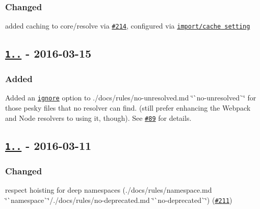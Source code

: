 \subsubsection*{Changed}


\begin{DoxyItemize}
\item added caching to core/resolve via \href{https://github.com/benmosher/eslint-plugin-import/issues/214}{\tt \#214}, configured via \href{./README.md#importcache}{\tt {\ttfamily import/cache} setting}
\end{DoxyItemize}

\subsection*{\href{https://github.com/benmosher/eslint-plugin-import/compare/v1.0.4...v1.1.0}{\tt 1..} -\/ 2016-\/03-\/15}

\subsubsection*{Added}


\begin{DoxyItemize}
\item Added an \href{./docs/rules/no-unresolved.md#ignore}{\tt {\ttfamily ignore}} option to ./docs/rules/no-\/unresolved.md \char`\"{}\`{}no-\/unresolved\`{}\char`\"{} for those pesky files that no resolver can find. (still prefer enhancing the Webpack and Node resolvers to using it, though). See \href{https://github.com/benmosher/eslint-plugin-import/issues/89}{\tt \#89} for details.
\end{DoxyItemize}

\subsection*{\href{https://github.com/benmosher/eslint-plugin-import/compare/v1.0.3...v1.0.4}{\tt 1..} -\/ 2016-\/03-\/11}

\subsubsection*{Changed}


\begin{DoxyItemize}
\item respect hoisting for deep namespaces (./docs/rules/namespace.md \char`\"{}\`{}namespace\`{}\char`\"{}/./docs/rules/no-\/deprecated.md \char`\"{}\`{}no-\/deprecated\`{}\char`\"{}) (\href{https://github.com/benmosher/eslint-plugin-import/pull/211}{\tt \#211})
\end{DoxyItemize}

